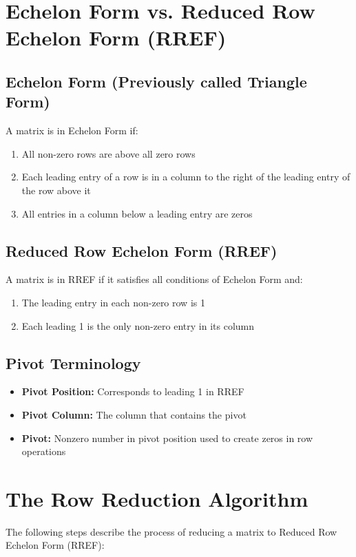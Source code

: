\documentclass{article}
\begin{document}
\section*{Echelon Form vs. Reduced Row Echelon Form (RREF)}

\subsection*{Echelon Form (Previously called Triangle Form)}
A matrix is in Echelon Form if:
\begin{enumerate}
    \item All non-zero rows are above all zero rows
    \item Each leading entry of a row is in a column to the right of the leading entry of the row above it
    \item All entries in a column below a leading entry are zeros
\end{enumerate}

\subsection*{Reduced Row Echelon Form (RREF)}
A matrix is in RREF if it satisfies all conditions of Echelon Form and:
\begin{enumerate}
    \item The leading entry in each non-zero row is 1
    \item Each leading 1 is the only non-zero entry in its column
\end{enumerate}

\subsection*{Pivot Terminology}
\begin{itemize}
    \item \textbf{Pivot Position:} Corresponds to leading 1 in RREF
    \item \textbf{Pivot Column:} The column that contains the pivot
    \item \textbf{Pivot:} Nonzero number in pivot position used to create zeros in row operations
\end{itemize}

\section*{The Row Reduction Algorithm}

The following steps describe the process of reducing a matrix to Reduced Row Echelon Form (RREF):
\end{document}
